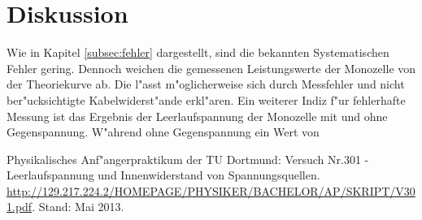 \section{Diskussion}
\label{diskussion}
	Wie in Kapitel \ref{subsec:fehler} dargestellt, sind die bekannten Systematischen Fehler gering.
	Dennoch weichen die gemessenen Leistungswerte der Monozelle von der Theoriekurve ab.
	Die l"asst m"oglicherweise sich durch Messfehler und nicht ber"ucksichtigte Kabelwiderst"ande erkl"aren.
	Ein weiterer Indiz f"ur fehlerhafte Messung ist das Ergebnis der Leerlaufspannung der Monozelle mit und ohne Gegenspannung.
	W"ahrend ohne Gegenspannung ein Wert von 

\begin{thebibliography}{9}
	 Physikalisches Anf"angerpraktikum der TU Dortmund: Versuch Nr.301 - Leerlaufspannung und Innenwiderstand von Spannungsquellen. \url{http://129.217.224.2/HOMEPAGE/PHYSIKER/BACHELOR/AP/SKRIPT/V301.pdf}. Stand: Mai 2013.
\end{thebibliography}
